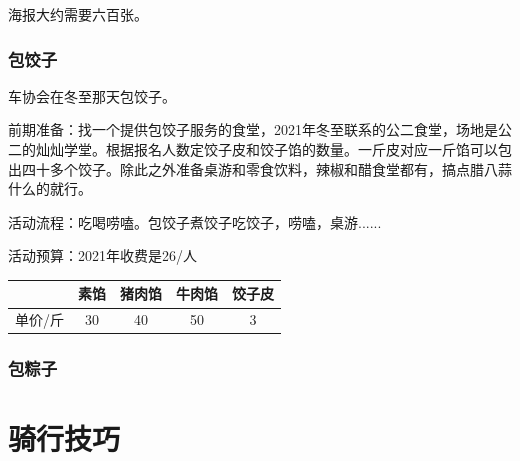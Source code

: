 \documentclass{ctexbook}
\begin{document}
海报大约需要六百张。

\subsection{包饺子}
车协会在冬至那天包饺子。

前期准备：找一个提供包饺子服务的食堂，2021年冬至联系的公二食堂，场地是公二的灿灿学堂。根据报名人数定饺子皮和饺子馅的数量。一斤皮对应一斤馅可以包出四十多个饺子。除此之外准备桌游和零食饮料，辣椒和醋食堂都有，搞点腊八蒜什么的就行。

活动流程：吃喝唠嗑。包饺子煮饺子吃饺子，唠嗑，桌游......

活动预算：2021年收费是26/人
\begin{table}[H]
    \centering
    \begin{tabular}{|c|c|c|c|c|}
    \hline
    ~  & 素馅 & 猪肉馅 & 牛肉馅 & 饺子皮 \\ \hline
    单价/斤 & 30 & 40  & 50  & 3   \\ \hline
    \end{tabular}
\end{table}

\subsection{包粽子}

\chapter{骑行技巧}
\end{document}
